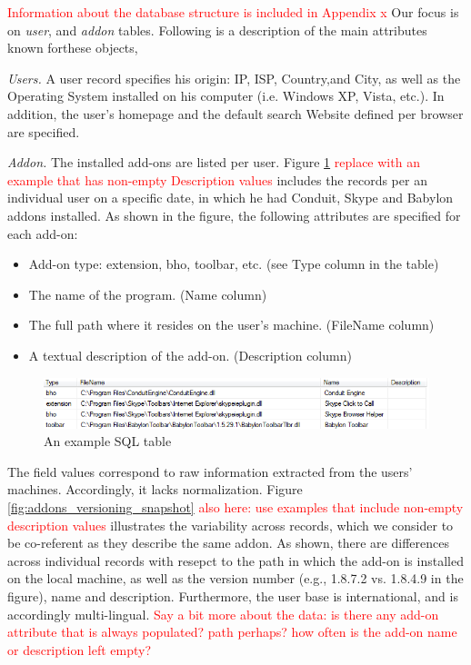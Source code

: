 \documentclass[11pt,oneside]{book}
\begin{document}
\textcolor{red}{Information about the database structure is included in Appendix x} Our focus is on {\it user}, and {\it addon} tables. Following is a description of the main attributes known forthese objects,

{\it Users.} A user record specifies his origin: IP, ISP, Country,and City, as well as the Operating System installed on his computer (i.e. Windows XP, Vista, etc.). In addition, the user's homepage and the default search Website defined per browser are specified.

{\it Addon.} The installed add-ons are listed per user. Figure \ref{fig:db_addons_snapshot} \textcolor{red}{replace with an example that has non-empty Description values} includes the records per an individual user on a specific date, in which he had Conduit, Skype and Babylon addons installed. As shown in the figure, the following attributes are specified for each add-on:
\begin{itemize}
\item Add-on type: extension, bho, toolbar, etc. (see Type column in the table)
\item The name of the program. (Name column)
\item The full path where it resides on the user's machine. (FileName column)
\item A textual description of the add-on. (Description column)
\end{itemize}

\begin{figure}[t]
\centering
\begin{small}
\includegraphics[scale=.8,angle=0]{figures/db_addons_snapshot.png}
\end{small}
\caption{An example SQL table}
\label{fig:db_addons_snapshot}
\end{figure}

The field values correspond to raw information extracted from the users' machines. Accordingly, it lacks normalization. Figure \ref{fig:addons_versioning_snapshot} \textcolor{red}{also here: use examples that include non-empty description values} illustrates the variability across records, which we consider to be co-referent as they describe the same addon. As shown, there are differences across individual records with resepct to the path in which the add-on is installed on the local machine, as well as the version number (e.g., 1.8.7.2 vs. 1.8.4.9 in the figure), name and description. Furthermore, the user base is international, and is accordingly multi-lingual.  \textcolor{red}{Say a bit more about the data: is there any add-on attribute that is always populated? path perhaps? how often is the add-on name or description left empty?}
\end{document}
